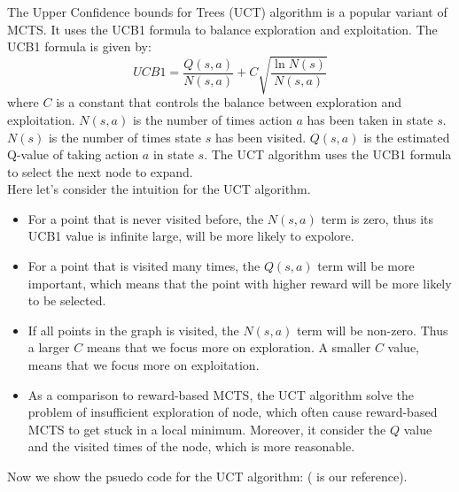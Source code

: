 \documentclass[11pt]{article}
\theoremstyle{definitionstyle}
\begin{document}
The Upper Confidence bounds for Trees (UCT) algorithm \cite{UCT} is a popular variant of MCTS. It uses the UCB1 formula to balance exploration and exploitation. The UCB1 formula is given by:
\[
    UCB1 = \frac{Q(s,a)}{N(s,a)} + C \sqrt{\frac{\ln N(s)}{N(s,a)}}
\]
where \(C\) is a constant that controls the balance between exploration and exploitation. $N(s,a)$ is the number of times action $a$ has been taken in state $s$. $N(s)$ is the number of times state $s$ has been visited. \(Q(s,a)\) is the estimated Q-value of taking action \(a\) in state \(s\). The UCT algorithm uses the UCB1 formula to select the next node to expand.\\
Here let's consider the intuition for the UCT algorithm.\\
\begin{itemize}
    \item For a point that is never visited before, the $N(s,a)$ term is zero, thus its UCB1 value is infinite large, will be more likely to expolore.
    \item For a point that is visited many times, the $Q(s,a)$ term will be more important, which means that the point with higher reward will be more likely to be selected.
    \item If all points in the graph is visited, the $N(s,a)$ term will be non-zero. Thus a larger $C$ means that we focus more on exploration. A smaller $C$ value, means that we focus more on exploitation.
    \item As a comparison to reward-based MCTS, the UCT algorithm solve the problem of insufficient exploration of node, which often cause reward-based MCTS to get stuck in a local minimum. Moreover, it consider the $Q$ value and the visited times of the node, which is more reasonable.
\end{itemize}
Now we show the psuedo code for the UCT algorithm: (\cite{MCTSsurvey} is our reference).
\end{document}
